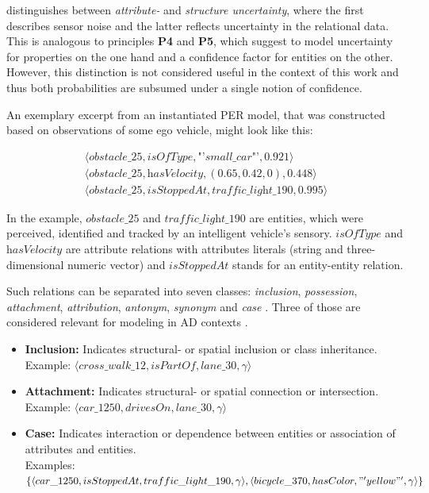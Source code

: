 \cite{Petrich2018} distinguishes between \textit{attribute-} and \textit{structure uncertainty}, where the first describes sensor noise and the latter reflects uncertainty in the relational data. This is analogous to principles \textbf{P4} and \textbf{P5}, which suggest to model uncertainty for properties on the one hand and a confidence factor for entities on the other. However, this distinction is not considered useful in the context of this work and thus both probabilities are subsumed under a single notion of confidence.

An exemplary excerpt from an instantiated PER model, that was constructed based on observations of some ego vehicle, might look like this:

\begin{gather*}
	\langle \textit{obstacle\_25}, \textit{isOfType}, \textit{"'small\_car"'}, 0.921 \rangle \\
	\langle \textit{obstacle\_25}, \textit{hasVelocity}, (0.65, 0.42, 0), 0.448 \rangle \\
	\langle \textit{obstacle\_25}, \textit{isStoppedAt}, \textit{traffic\_light\_190}, 0.995 \rangle
\end{gather*}

In the example, $\textit{obstacle\_25}$ and $\textit{traffic\_light\_190}$ are entities, which were perceived, identified and tracked by an intelligent vehicle's sensory. $\textit{isOfType}$ and $\textit{hasVelocity}$ are attribute relations with attributes literals (string and three-dimensional numeric vector) and $\textit{isStoppedAt}$ stands for an entity-entity relation.

Such relations can be separated into seven classes: \textit{inclusion}, \textit{possession}, \textit{attachment}, \textit{attribution}, \textit{antonym}, \textit{synonym} and \textit{case} \cite{Storey1993}. Three of those are considered relevant for modeling in AD contexts \cite{Petrich2018}.

\begin{itemize}
	\item \textbf{Inclusion:} Indicates structural- or spatial inclusion or class inheritance. \\ Example: $\langle  cross\_walk\_12, isPartOf, lane\_30, \gamma \rangle$
	\item \textbf{Attachment:} Indicates structural- or spatial connection or intersection. \\ Example: $\langle car\_1250, drivesOn, lane\_30, \gamma \rangle$
	\item \textbf{Case:} Indicates interaction or dependence between entities or association of attributes and entities. \\ Examples: $\{ \langle car\_1250, isStoppedAt, traffic\_light\_190, \gamma \rangle, \langle bicycle\_370, hasColor, \\ "'yellow"', \gamma \rangle \}$
\end{itemize}


